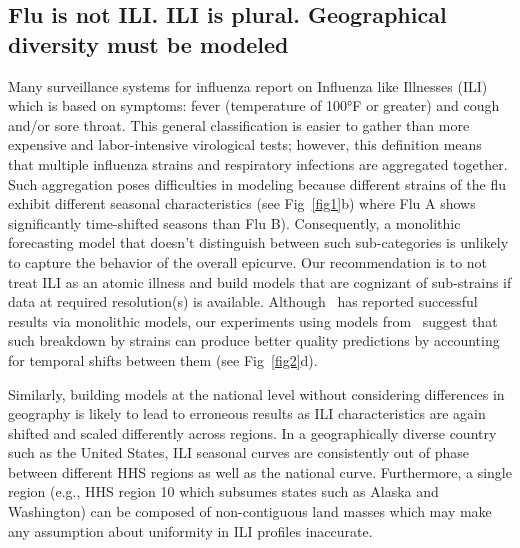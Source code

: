\documentclass[10pt,letterpaper]{article}
\begin{document}
\subsection*{Flu is not ILI. ILI is plural. Geographical diversity must be
modeled}
Many surveillance systems for influenza report on Influenza like Illnesses
(ILI)~\cite{cdc} which is based on symptoms: fever (temperature of 100°F or
greater) and cough and/or sore throat.  This general classification is easier
to gather than more expensive and labor-intensive virological tests; however,
this definition means that multiple influenza strains and respiratory
infections are aggregated together. Such aggregation poses difficulties in
modeling because different strains of the flu exhibit different seasonal
characteristics (see Fig~\ref{fig1}b) where Flu A shows significantly time-shifted
seasons than Flu B).  Consequently, a monolithic forecasting model that doesn't distinguish 
between such sub-categories is unlikely to
capture the behavior of the overall epicurve. Our recommendation is to not
treat ILI as an atomic illness and build models that are cognizant of sub-strains
if data at required resolution(s) is available.
Although~\cite{axelsen2014multiannual} has reported successful results via 
monolithic models, our experiments using models from~\cite{chakraborty2014forecasting} suggest that such
breakdown by strains can produce better quality predictions by accounting for
temporal shifts between them (see Fig~\ref{fig2}d).

Similarly, building models at the national level without
considering differences in geography is likely to lead to erroneous results as
ILI characteristics are again shifted and scaled differently across regions. In
a geographically diverse country such as the United States, ILI seasonal curves
are consistently out of phase between different HHS regions as well as the
national curve. Furthermore, a single region (e.g., HHS region 10 which subsumes
states such as Alaska and Washington) can be composed of non-contiguous land
masses which may make any assumption about uniformity in ILI profiles
inaccurate.
\end{document}
